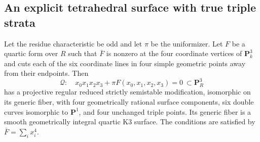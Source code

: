 \subsection{An explicit tetrahedral surface with true triple strata}

\begin{proposition}
\label{r20at:quartic}
Let the residue characteristic be odd and let $\pi$ be the
uniformizer.  Let $F$ be a quartic form over $R$ such that
$\bar F$ is nonzero at the four coordinate vertices of
$\mathbf P^3_k$ and cuts each of the six coordinate lines in
four simple geometric points away from their endpoints.  Then
\[
 \mathcal Q:\quad x_0x_1x_2x_3+\pi F(x_0,x_1,x_2,x_3)=0
                    \ \subset\mathbf P^3_R
 \tag{AT20.10}\label{r20at:quarticequation}
\]
has a projective regular reduced strictly semistable modification,
isomorphic on its generic fiber, with four geometrically rational
surface components, six double curves isomorphic to
$\mathbf P^1$, and four unchanged triple points.  Its generic
fiber is a smooth geometrically integral quartic K3 surface.
The conditions are satisfied by $\bar F=\sum_i x_i^4$.
\end{proposition}

